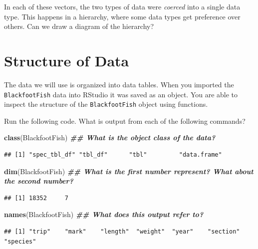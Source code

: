 \documentclass[
  10pt,
  letterpaper,
  twoside,
  openright]{book}
\newenvironment{Shaded}{\begin{snugshade}}{\end{snugshade}}
\newcommand{\DocumentationTok}[1]{\textcolor[rgb]{0.56,0.35,0.01}{\textbf{\textit{#1}}}}
\newcommand{\FunctionTok}[1]{\textcolor[rgb]{0.13,0.29,0.53}{\textbf{#1}}}
\newcommand{\NormalTok}[1]{#1}
\begin{document}
In each of these vectors, the two types of data were \emph{coerced} into
a single data type. This happens in a hierarchy, where some data types
get preference over others. Can we draw a diagram of the hierarchy?

\hypertarget{structure-of-data}{%
\section{Structure of Data}\label{structure-of-data}}

The data we will use is organized into data tables. When you imported
the \texttt{BlackfootFish} data into RStudio it was saved as an object.
You are able to inspect the structure of the \texttt{BlackfootFish}
object using functions.

Run the following code. What is output from each of the following
commands?

\begin{Shaded}
\begin{Highlighting}[]
\FunctionTok{class}\NormalTok{(BlackfootFish) }\DocumentationTok{\#\# What is the object class of the data?}
\end{Highlighting}
\end{Shaded}

\begin{verbatim}
## [1] "spec_tbl_df" "tbl_df"      "tbl"         "data.frame"
\end{verbatim}

\begin{Shaded}
\begin{Highlighting}[]
\FunctionTok{dim}\NormalTok{(BlackfootFish) }\DocumentationTok{\#\# What is the first number represent? What about the second number?}
\end{Highlighting}
\end{Shaded}

\begin{verbatim}
## [1] 18352     7
\end{verbatim}

\begin{Shaded}
\begin{Highlighting}[]
\FunctionTok{names}\NormalTok{(BlackfootFish) }\DocumentationTok{\#\# What does this output refer to?}
\end{Highlighting}
\end{Shaded}

\begin{verbatim}
## [1] "trip"    "mark"    "length"  "weight"  "year"    "section" "species"
\end{verbatim}
\end{document}

